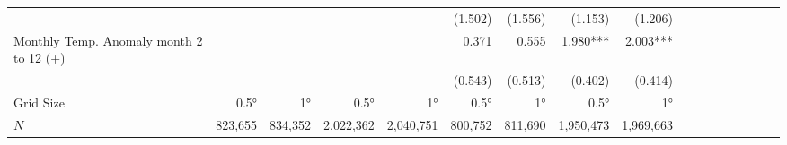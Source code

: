 \begin{table}[H]
\begin{adjustbox}{max width=\linewidth}
\begin{tabular}{lrrrrrrrrrrrrrrrr}
                                             &              &             &             &              &      (1.502) &      (1.556)  &       (1.153) &      (1.206) \\
Monthly Temp. Anomaly month 2 to 12 (+)      &              &             &             &              &        0.371 &        0.555  &      1.980*** &     2.003*** \\
                                             &              &             &             &              &      (0.543) &      (0.513)  &       (0.402) &      (0.414) \\

\midrule
Grid Size                                   &       0.5° &      1°    &         0.5° &      1°   &      0.5° &     1°    &          0.5° &      1°   \\ 
$N$                                         &      823,655 &     834,352 &  2,022,362 &   2,040,751 &   800,752 &      811,690 &     1,950,473 &    1,969,663  \\ 
\bottomrule
\end{tabular}
\end{adjustbox}
\end{table}